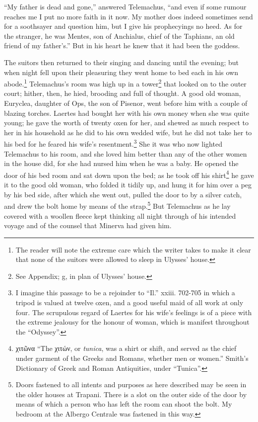 “My father is dead and gone,” answered Telemachus, “and even if some rumour
reaches me I put no more faith in it now. My mother does indeed sometimes send
for a soothsayer and question him, but I give his prophecyings no heed. As for
the stranger, he was Mentes, son of Anchialus, chief of the Taphians, an old
friend of my father’s.” But in his heart he knew that it had been the goddess.

The suitors then returned to their singing and dancing until the evening; but
when night fell upon their pleasuring they went home to bed each in his own
abode.\footnote{The reader will note the extreme care which the writer takes to make it
clear that none of the suitors were allowed to sleep in Ulysses’ house.}
Telemachus’s room was high up in a tower\footnote{See Appendix; g, in plan of Ulysses’ house.} that looked on to the outer court;
hither, then, he hied, brooding and full of thought. A good old woman,
Euryclea, daughter of Ops, the son of Pisenor, went before him with a couple of
blazing torches. Laertes had bought her with his own money when she was quite
young; he gave the worth of twenty oxen for her, and shewed as much respect to
her in his household as he did to his own wedded wife, but he did not take her
to his bed for he feared his wife’s resentment.\footnote{I imagine this passage to be a rejoinder to “Il.” xxiii. 702-705 in which a
tripod is valued at twelve oxen, and a good useful maid of all work at only
four. The scrupulous regard of Laertes for his wife’s feelings is of a piece
with the extreme jealousy for the honour of woman, which is manifest
throughout the “Odyssey”.} She it was who now lighted Telemachus
to his room, and she loved him better than any of the other women in the house
did, for she had nursed him when he was a baby. He opened the door of his bed
room and sat down upon the bed; as he took off his shirt\footnote{χιτῶνα “The χιτών,
or \emph{tunica}, was a shirt or shift, and served as the chief under garment
of the Greeks and Romans, whether men or women.” Smith’s Dictionary of Greek
and Roman Antiquities, under “Tunica”.} he gave it to the good old woman, who
folded it tidily up, and hung it for him over a peg by his bed side, after
which she went out, pulled the door to by a silver catch, and drew the bolt
home by means of the strap.\footnote{Doors fastened to all intents and purposes as here described may be seen in
the older houses at Trapani. There is a slot on the outer side of the door by
means of which a person who has left the room can shoot the bolt. My bedroom
at the Albergo Centrale was fastened in this way.} But Telemachus as he lay covered with
a woollen fleece kept thinking all night through of his intended voyage and of
the counsel that Minerva had given him.

